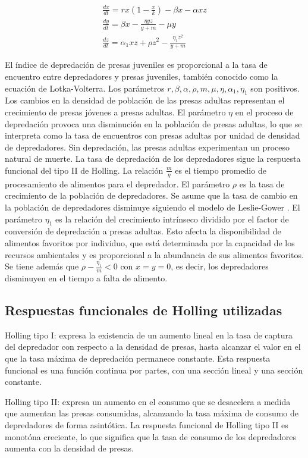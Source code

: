 \documentclass{wscpaperproc}
\theoremstyle{wsc}
\begin{document}
\begin{equation} \label{twoPreyonePredatorEDO}
	\begin{gathered}
		\frac{d x}{d t}=r x\left(1-\frac{x}{k}\right)-\beta x-\alpha x z \\
		\frac{d y}{d t}=\beta x-\frac{\eta y z}{y+m}-\mu y \\
		\frac{d z}{d t}=\alpha_1 x z + \rho z^2-\frac{\eta_1 z^2}{y+m}
	\end{gathered}
\end{equation}
\par
El índice de depredación de presas juveniles es proporcional a la tasa de encuentro entre depredadores y presas juveniles, también conocido como la ecuación de Lotka-Volterra. Los parámetros $r, \beta, \alpha, \rho, m, \mu, \eta , \alpha_1, \eta_1$ son positivos.
Los cambios en la densidad de población de las presas adultas representan el crecimiento de presas j\'ovenes a presas adultas.
El parámetro $\eta$ en el proceso de depredación provoca una disminución en la población de presas adultas, lo que se interpreta
como la tasa de encuentros con presas adultas por unidad de densidad de depredadores. Sin depredación, las presas adultas experimentan un proceso natural
de muerte. La tasa de depredación de los depredadores sigue la respuesta funcional del tipo II de Holling. La relación $\frac{m}{\eta}$ es el tiempo promedio de
procesamiento de alimentos para el depredador. El parámetro $\rho$ es la tasa de crecimiento de la población de depredadores. Se asume que la tasa de cambio
en la población de depredadores disminuye siguiendo el modelo de Leslie-Gower \cite{leslie_properties_1960}. El parámetro $\eta_1$ es la relación del crecimiento intrínseco dividido por el factor de conversión de depredación a presas adultas.
Esto afecta la disponibilidad de alimentos favoritos por individuo, que está determinada por la capacidad de los recursos ambientales y es proporcional a la
abundancia de sus alimentos favoritos. Se tiene además que $\rho - \frac{\eta_1}{m} < 0$ con $x=y=0$, es decir, los depredadores disminuyen en el tiempo a falta de alimento.

\subsection{Respuestas funcionales de Holling utilizadas}
Holling tipo I: expresa la existencia de un aumento lineal en la tasa de captura del depredador con respecto a la densidad de presas, hasta alcanzar el valor en
el que la tasa máxima de depredación permanece constante. Esta respuesta funcional es una función continua por partes, con una sección lineal y una sección constante.\par
Holling tipo II: expresa un aumento en el consumo que se desacelera a medida que aumentan las presas consumidas, alcanzando la tasa máxima de consumo de
depredadores de forma asintótica. La respuesta funcional de Holling tipo II es monotóna creciente, lo que significa que la tasa de consumo
de los depredadores aumenta con la densidad de presas.
\end{document}
